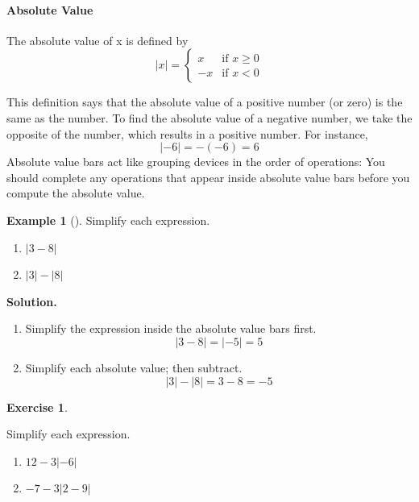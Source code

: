 \documentclass[10pt,]{book}
\theoremstyle{plain}
\theoremstyle{definition}
\theoremstyle{definition}
\theoremstyle{definition}
\newtheorem{example}[theorem]{Example}
\theoremstyle{definition}
\theoremstyle{definition}
\newtheorem{exercise}[theorem]{Exercise}
\numberwithin{equation}{section}
\newcommand\abs[1]{\left|#1\right|}
\newcommand{\lt}{ < }
\newcommand{\amp}{ & }
\begin{document}
\paragraph[Absolute Value]{Absolute Value}\label{paragraphs-24}

   The absolute value of x is defined by
   \begin{equation*}
    \abs{x} =
    \begin{cases}
    x \amp \text{if } x\ge 0\\
    -x  \amp \text{if } x\lt 0
    \end{cases}
    \end{equation*}
%
\par

    This definition says that the absolute value of a positive number (or zero) is the same as the number. To find the absolute value of a negative number, we take the opposite of the number, which results in a positive number. For instance,
    \begin{equation*}\abs{−6} = −(−6) = 6\end{equation*}
    Absolute value bars act like grouping devices in the order of operations: You should complete any operations that appear inside absolute value bars before you compute the absolute value.
%
\begin{example}[]\label{example-abs}
Simplify each expression.%
\leavevmode%
\begin{enumerate}[label=*\alph**]
\item\hypertarget{li-253}{}\(\abs{3 − 8}\)\item\hypertarget{li-254}{}\(\abs{3} − \abs{8}\)\end{enumerate}
\par\medskip\noindent%
\textbf{Solution.}\quad \leavevmode%
\begin{enumerate}[label=*\alph**]
\item\hypertarget{li-255}{}Simplify the expression inside the absolute value bars first.
            \begin{equation*}\abs{3 − 8} = \abs{−5} = 5\end{equation*}\item\hypertarget{li-256}{}Simplify each absolute value; then subtract.
            \begin{equation*}\abs{3} − \abs{8} = 3 − 8 = −5\end{equation*}\end{enumerate}
\end{example}
\begin{exercise}\label{exercise-abs}

    Simplify each expression.
    \leavevmode%
\begin{enumerate}[label=*\alph**]
\item\hypertarget{li-257}{}\(12 − 3\abs{−6}\)\item\hypertarget{li-258}{}\(−7 − 3\abs{2 − 9}\)\end{enumerate}
\end{exercise}
\typeout{************************************************}
\typeout{************************************************}
\end{document}
